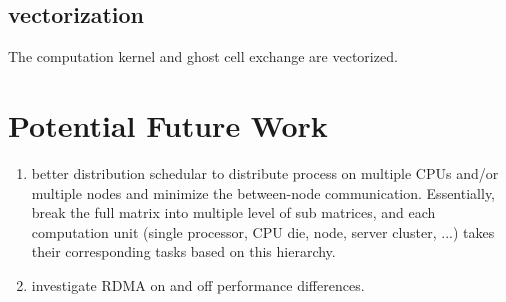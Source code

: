 \documentclass[12pt]{article}
\begin{document}
\subsection{vectorization}
The computation kernel and ghost cell exchange are vectorized.

\section{Potential Future Work}
\begin{enumerate}
    \item better distribution schedular to 
    distribute process on multiple CPUs and/or multiple nodes 
    and minimize the between-node communication.
    Essentially, break the full matrix into multiple level of sub matrices,
    and each computation unit (single processor, CPU die, node, server cluster, ...)
    takes their corresponding tasks based on this hierarchy. 
    \item investigate RDMA on and off performance differences.
\end{enumerate}
\end{document}
